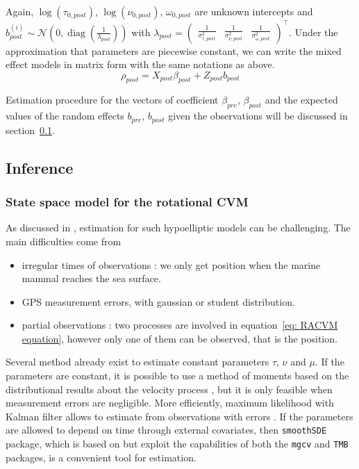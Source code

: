 \documentclass[11pt]{article}
\DeclareMathOperator{\diag}{diag}
\newcommand {\1}{\mathbb{1}}
\begin{document}
Again, $\log(\tau_{0,post})$, $\log(\nu_{0,post})$, $\omega_{0,post}$ are unknown intercepts and $b^{(i)}_{post} \sim \mathcal{N}\left( 0, \diag\left(\frac{1}{\lambda_{post}}\right)\right)$ with $\lambda_{post}=\begin{pmatrix} \frac{1}{\sigma_{\tau,post}^2} & \frac{1}{\sigma_{\nu,post}^2} & \frac{1}{\sigma_{\omega,post}^2} \end{pmatrix}^\top$.
Under the approximation that parameters are piecewise constant, we can write the mixed effect models in matrix form with the same notations as above.
\begin{equation}
	\rho_{post}
	=X_{post} \beta_{post}
	+Z_{post} b_{post}
\end{equation}

Estimation procedure for the vectors of coefficient $\beta_{pre}$, $\beta_{post}$ and the expected values of the random effects $b_{pre}$, $b_{post}$ given the observations will be discussed in section~\ref{section: inference}.\\


\subsection{Inference}
\label{section: inference}

\subsubsection{State space model for the rotational CVM}

As discussed in \cite{ditlevsen_hypoelliptic_2018}, estimation for such hypoelliptic models can be challenging. The main difficulties come from
\begin{itemize}
	 \item irregular times of observations : we only get position when the marine mammal reaches the sea surface.
	 \item GPS measurement errors, with gaussian or student distribution.
	 \item partial observations : two processes are involved in equation~\ref{eq: RACVM equation}, however only one of them can be observed, that is the position.
\end{itemize}


Several method already exist to estimate constant parameters $\tau$, $\nu$ and $\mu$.
If the parameters are constant, it is possible to use a method of moments based on the distributional results about the velocity process \cite{gurarie_correlated_2017}, but it is only feasible when measurement errors are negligible. More efficiently, maximum likelihood with Kalman filter allows to estimate from observations with errors \cite{johnson_continuous_2008}.
If the parameters are allowed to depend on time through external covariates, then \texttt{smoothSDE} package, which is based on \cite{johnson_continuous_2008} but exploit the capabilities of both the \texttt{mgcv} \cite{wood_generalized_2017} and \texttt{TMB} \cite{kristensen_tmb_2016} packages, is a convenient tool for estimation. 
\end{document}
